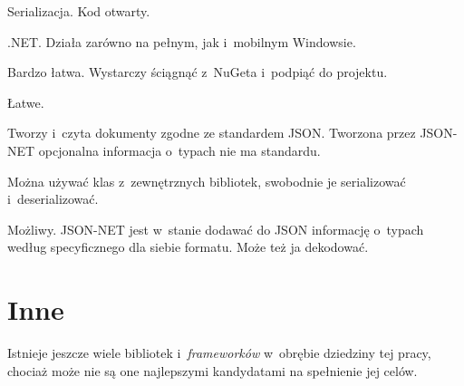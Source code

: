 \begin{description}
Serializacja. Kod otwarty.

.NET. Działa zarówno na pełnym, jak i~mobilnym Windowsie.

Bardzo łatwa. Wystarczy ściągnąć z~NuGeta i~podpiąć do projektu.

Łatwe.

Tworzy i~czyta dokumenty zgodne ze standardem JSON.
Tworzona przez JSON-NET opcjonalna informacja o~typach nie ma standardu.

Można używać klas z~zewnętrznych bibliotek, swobodnie je serializować i~deserializować.

Możliwy.
JSON-NET jest w~stanie dodawać do JSON informację o~typach według specyficznego dla siebie formatu.
Może też ja dekodować.
\end{description}



\section{Inne}
Istnieje jeszcze wiele bibliotek i~\emph{frameworków} w~obrębie dziedziny tej pracy, chociaż może nie są one najlepszymi kandydatami na spełnienie jej celów.


